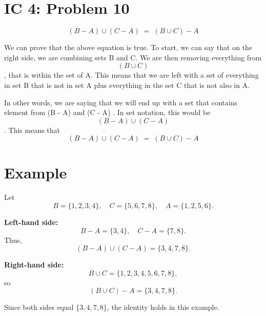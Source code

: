 \documentclass{article}
\title{IC 4: #10}
\author{Pranav B}
\date{September 2025}
\begin{document}
\maketitle

\section{IC 4: Problem 10}

\[
(B - A) \cup (C - A) \;=\; (B \cup C) - A
\]

We can prove that the above equation is true. To start, we can say that on the right side, we are combining sets B and C. We are then removing everything from \[(B \cup C)\], that is within the set of A. This means that we are left with a set of everything in set B that is not in set A plus everything in the set C that is not also in A. 

In other words, we are saying that we will end up with a set that contains element from 
(B - A) and (C - A)
. In set notation, this would be \[
(B - A) \cup (C - A)
\]. This means that \[
(B - A) \cup (C - A) \;=\; (B \cup C) - A
\]

\section*{Example}

Let 
\[
B = \{1,2,3,4\}, \quad C = \{5,6,7,8\}, \quad A = \{1,2,5,6\}.
\]

\textbf{Left-hand side:}
\[
B - A = \{3,4\}, \quad C - A = \{7,8\}.
\]
Thus,
\[
(B - A) \cup (C - A) = \{3,4,7,8\}.
\]

\textbf{Right-hand side:}
\[
B \cup C = \{1,2,3,4,5,6,7,8\},
\]
so
\[
(B \cup C) - A = \{3,4,7,8\}.
\]

Since both sides equal $\{3,4,7,8\}$, the identity holds in this example.
\end{document}
